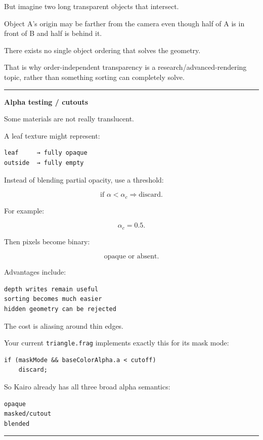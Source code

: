But imagine two long transparent objects that intersect.

Object A's origin may be farther from the camera even though half of A is in front of B and half is behind it.

There exists no single object ordering that solves the geometry.

That is why order-independent transparency is a research/advanced-rendering topic, rather than something sorting can completely solve.

\begin{center}\rule{0.5\linewidth}{0.5pt}\end{center}

\textbf{Alpha testing / cutouts}

Some materials are not really translucent.

A leaf texture might represent:

\begin{verbatim}
leaf     → fully opaque
outside  → fully empty
\end{verbatim}

Instead of blending partial opacity, use a threshold:

\[
\text{if }\alpha < \alpha_c
\Rightarrow
\text{discard}.
\]

For example:

\[
\alpha_c=0.5.
\]

Then pixels become binary:

\[
\text{opaque or absent}.
\]

Advantages include:

\begin{verbatim}
depth writes remain useful
sorting becomes much easier
hidden geometry can be rejected
\end{verbatim}

The cost is aliasing around thin edges.

Your current \texttt{triangle.frag} implements exactly this for its mask mode:

\begin{verbatim}
if (maskMode && baseColorAlpha.a < cutoff)
    discard;
\end{verbatim}

So Kairo already has all three broad alpha semantics:

\begin{verbatim}
opaque
masked/cutout
blended
\end{verbatim}

\begin{center}\rule{0.5\linewidth}{0.5pt}\end{center}

